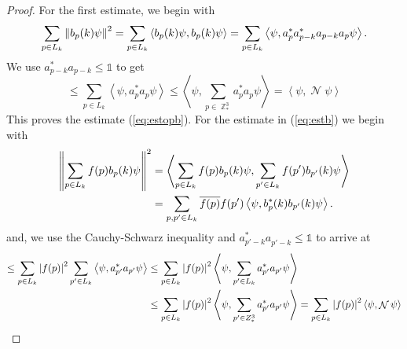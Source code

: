 \documentclass[sn-mathphys, Numbered ,a4paper]{sn-jnl}%
\DeclareMathOperator{\Z}{\mathbb{Z}}
\DeclareMathOperator{\NN}{\mathcal{N}}
\newcommand{\eva}[1]{\left\langle #1 \right\rangle}
\theoremstyle{plain}
\theoremstyle{definition}
\theoremstyle{remark}
\theoremstyle{plain}
\theoremstyle{definition}
\theoremstyle{remark}
\begin{document}
\begin{proof}
    For the first estimate, we begin with
    \begin{equation}
         \sum\limits_{p \in L_k}\norm{b_p(k)\psi}^2 = \sum\limits_{p \in L_k} \eva{b_p(k)\psi,b_p(k)\psi}= \sum\limits_{p \in L_k} \eva{\psi,a^*_{p} a^*_{p-k}a_{p-k} a_{p}\psi}.  
    \end{equation}
    We use $a^*_{p-k}a_{p-k} \leq \mathds{1}$ to get 
    \begin{equation}
        \leq \sum\limits_{p \in L_k} \eva{\psi,a^*_{p} a_{p}\psi}
        \leq \eva{\psi,\sum\limits_{p \in \Z^3_*}a^*_{p} a_{p}\psi} = \eva{\psi, \NN\psi}
    \end{equation}
    This proves the estimate (\ref{eq:estopb}). For the estimate in (\ref{eq:estb}) we begin with
    \begin{align}
        \norm{\sum\limits_{p\in L_k}f(p)b_p(k)\psi}^2 &= \eva{\sum\limits_{p\in L_k}f(p)b_p(k)\psi,\sum\limits_{p'\in L_k}f(p')b_{p'}(k)\psi}\nonumber\\
        &= \sum\limits_{p,p' \in L_k} \overline{f(p)}f(p') \eva{\psi,b^*_p(k)b_{p'}(k)\psi} \nonumber.  
    \end{align}
    and, we use the Cauchy-Schwarz inequality and $a^*_{p'-k}a^{\phantom{*}}_{p'-k} \leq \mathds{1}$ to arrive at 
    \begin{align}
        \leq \sum\limits_{p \in L_k} \abs{f(p)}^2 \sum\limits_{p' \in L_k} \eva{\psi,a^*_{p'} a_{p'} \psi} &\leq \sum\limits_{p \in L_k} \abs{f(p)}^2 \eva{\psi, \sum\limits_{p' \in L_k} a^*_{p'} a_{p'} \psi}\nonumber\\
        &\leq \sum\limits_{p \in L_k} \abs{f(p)}^2 \eva{\psi, \sum\limits_{p' \in Z^3_*} a^*_{p'} a_{p'} \psi}= \sum\limits_{p \in L_k} \abs{f(p)}^2 \eva{\psi, \NN \psi}
    \end{align}
    

\end{proof}
\end{document}
